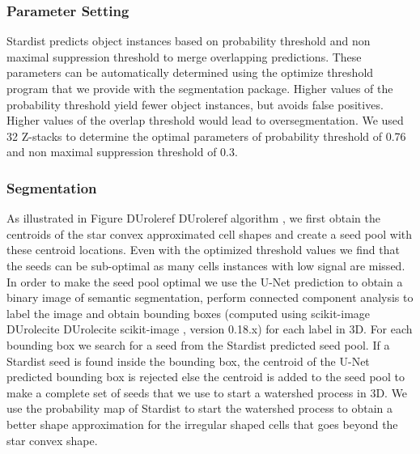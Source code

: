 \documentclass[letterpaper,compsoc,twoside]{IEEEtran}
\providecommand*{\DUrole}[2]{%
  \ifcsname DUrole#1\endcsname%
    \csname DUrole#1\endcsname{#2}%
  \else%
    #2%
  \fi%
}
\begin{document}
\subsubsection{Parameter Setting%
  \label{parameter-setting}%
}


Stardist predicts object instances based on probability threshold and non maximal suppression threshold to merge overlapping predictions. These parameters can be automatically determined using the optimize threshold program that we provide with the segmentation package. Higher values of the probability threshold yield fewer object instances, but avoids false positives. Higher values of the overlap threshold would lead to oversegmentation. We used 32 Z-stacks to determine the optimal parameters of probability threshold of 0.76 and non maximal suppression threshold of 0.3.

\subsubsection{Segmentation%
  \label{segmentation}%
}


As illustrated in Figure \DUrole{ref}{algorithm}, we first obtain the centroids of the star convex approximated cell shapes and create a seed pool with these centroid locations. Even with the optimized threshold values we find that the seeds can be sub-optimal as many cells instances with low signal are missed. In order to make the seed pool optimal we use the U-Net prediction to obtain a binary image of semantic segmentation, perform connected component analysis to label the image and obtain bounding boxes (computed using scikit-image \DUrole{cite}{scikit-image}, version 0.18.x) for each label in 3D. For each bounding box we search for a seed from the Stardist predicted seed pool. If a Stardist seed is found inside the bounding box, the centroid of the U-Net predicted bounding box is rejected else the centroid is added to the seed pool to make a complete set of seeds that we use to start a watershed process in 3D. We use the probability map of Stardist to start the watershed process to obtain a better shape approximation for the irregular shaped cells that goes beyond the star convex shape.
\end{document}
